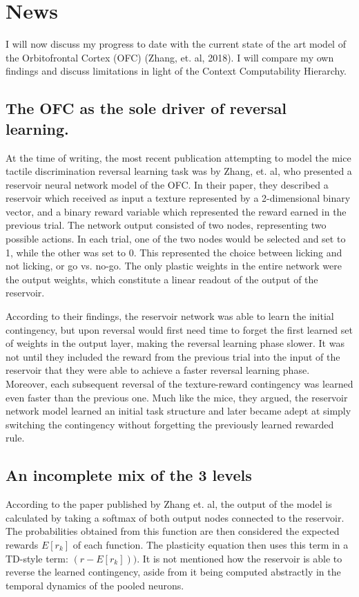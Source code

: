 \documentclass[]{article}
\begin{document}
\section{News}
I will now discuss my progress to date with the current state of the art model of the Orbitofrontal Cortex (OFC) (Zhang, et. al, 2018).  I will compare my own findings and discuss limitations in light of the Context Computability Hierarchy.

\subsection{The OFC as the sole driver of reversal learning.}
At the time of writing, the most recent publication attempting to model the mice tactile discrimination reversal learning task was by Zhang, et. al, who presented a reservoir neural network model of the OFC.  In their paper, they described a reservoir which received as input a texture represented by a 2-dimensional binary vector, and a binary reward variable which represented the reward earned in the previous trial.  The network output consisted of two nodes, representing two possible actions.  In each trial, one of the two nodes would be selected and set to 1, while the other was set to 0.  This represented the choice between licking and not licking, or go vs. no-go.  The only plastic weights in the entire network were the output weights, which constitute a linear readout of the output of the reservoir.

According to their findings, the reservoir network was able to learn the initial contingency, but upon reversal would first need time to forget the first learned set of weights in the output layer, making the reversal learning phase slower.  It was not until they included the reward from the previous trial into the input of the reservoir that they were able to achieve a faster reversal learning phase.  Moreover, each subsequent reversal of the texture-reward contingency was learned even faster than the previous one.  Much like the mice, they argued, the reservoir network model learned an initial task structure and later became adept at simply switching the contingency without forgetting the previously learned rewarded rule.

\subsection{An incomplete mix of the 3 levels}
According to the paper published by Zhang et. al, the output of the model is calculated by taking a softmax of both output nodes connected to the reservoir.  The probabilities obtained from this function are then considered the expected rewards $E[r_k]$ of each function.  The plasticity equation  then uses this term in a TD-style term: $(r - E[r_k]))$.  It is not mentioned how the reservoir is able to reverse the learned contingency, aside from it being computed abstractly in the temporal dynamics of the pooled neurons.
\end{document}
